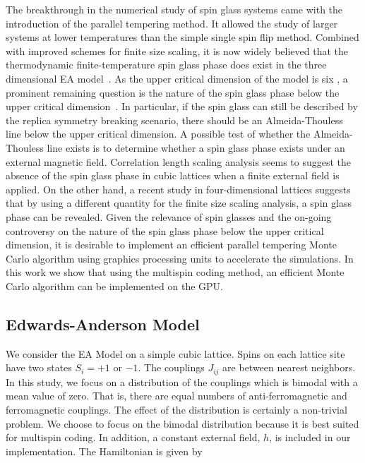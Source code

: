The breakthrough in the numerical study of spin glass systems came with the 
introduction of the parallel tempering method. It allowed the study of larger 
systems at lower temperatures than the simple single spin flip %
method. \cite{Swendsen-Wang-1986,Hukushima-Nemoto1996,Marinari-Parisi1992} Combined with 
improved schemes for finite size scaling, it is now widely believed that the thermodynamic 
finite-temperature spin glass phase does exist in the three dimensional EA 
model~\cite{Ballesteros2000}. As the upper critical dimension of the 
model is six \cite{Harris-Lubensky-Chen-1976,Tasaki-1989,Green-Moore-Bray-1983}, a
prominent remaining question is the nature of the 
spin glass phase below the upper critical dimension~\cite{Young-Katzgraber2004}. 
In particular, if the spin glass can still be described by the replica symmetry 
breaking scenario, there should be an Almeida-Thouless line below the upper 
critical dimension. A possible test of whether the Almeida-Thouless 
line exists is to determine whether a spin glass phase exists under an external 
magnetic field. Correlation length scaling analysis seems to suggest the 
absence of the spin glass phase in cubic lattices when a finite external field is applied.\cite{Young-Katzgraber-2004} 
On the other hand, a recent study in four-dimensional lattices suggests that by using a different quantity for the 
finite size scaling analysis, a spin glass phase can be revealed. \cite{Banos2012} 
Given the relevance of spin glasses and the on-going controversy on the nature 
of the spin glass phase below the upper critical dimension, it is desirable to 
implement an efficient parallel tempering Monte Carlo algorithm using 
graphics processing units to accelerate the simulations. In this work we show that 
using the multispin coding method, \cite{Zorn-Herrmann-Rebbi-1981} an efficient Monte Carlo algorithm can be implemented 
on the GPU. 


\subsection{Edwards-Anderson Model}

We consider the EA Model \cite{Edwards-Anderson1975} on a 
simple cubic lattice. Spins on each lattice site have two states 
$S_i=+1$ or $-1$. The couplings $J_{ij}$ are between nearest neighbors. In this 
study, we focus on a distribution of the couplings which is bimodal with a mean 
value of zero. That is, there are equal numbers of anti-ferromagnetic and ferromagnetic 
couplings. The effect of the distribution is certainly a non-trivial problem. 
We choose to focus on the bimodal distribution  because it is best suited for multispin coding. 
In addition, a constant external field, $h$, is included in our implementation. 
The Hamiltonian is given by 

